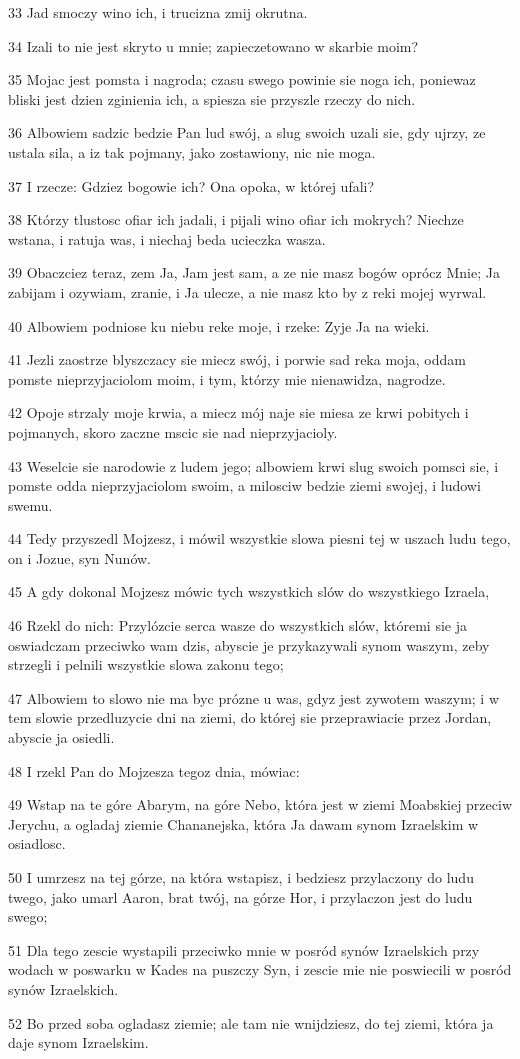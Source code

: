 \par 33 Jad smoczy wino ich, i trucizna zmij okrutna.
\par 34 Izali to nie jest skryto u mnie; zapieczetowano w skarbie moim?
\par 35 Mojac jest pomsta i nagroda; czasu swego powinie sie noga ich, poniewaz bliski jest dzien zginienia ich, a spiesza sie przyszle rzeczy do nich.
\par 36 Albowiem sadzic bedzie Pan lud swój, a slug swoich uzali sie, gdy ujrzy, ze ustala sila, a iz tak pojmany, jako zostawiony, nic nie moga.
\par 37 I rzecze: Gdziez bogowie ich? Ona opoka, w której ufali?
\par 38 Którzy tlustosc ofiar ich jadali, i pijali wino ofiar ich mokrych? Niechze wstana, i ratuja was, i niechaj beda ucieczka wasza.
\par 39 Obaczciez teraz, zem Ja, Jam jest sam, a ze nie masz bogów oprócz Mnie; Ja zabijam i ozywiam, zranie, i Ja ulecze, a nie masz kto by z reki mojej wyrwal.
\par 40 Albowiem podniose ku niebu reke moje, i rzeke: Zyje Ja na wieki.
\par 41 Jezli zaostrze blyszczacy sie miecz swój, i porwie sad reka moja, oddam pomste nieprzyjaciolom moim, i tym, którzy mie nienawidza, nagrodze.
\par 42 Opoje strzaly moje krwia, a miecz mój naje sie miesa ze krwi pobitych i pojmanych, skoro zaczne mscic sie nad nieprzyjacioly.
\par 43 Weselcie sie narodowie z ludem jego; albowiem krwi slug swoich pomsci sie, i pomste odda nieprzyjaciolom swoim, a milosciw bedzie ziemi swojej, i ludowi swemu.
\par 44 Tedy przyszedl Mojzesz, i mówil wszystkie slowa piesni tej w uszach ludu tego, on i Jozue, syn Nunów.
\par 45 A gdy dokonal Mojzesz mówic tych wszystkich slów do wszystkiego Izraela,
\par 46 Rzekl do nich: Przylózcie serca wasze do wszystkich slów, któremi sie ja oswiadczam przeciwko wam dzis, abyscie je przykazywali synom waszym, zeby strzegli i pelnili wszystkie slowa zakonu tego;
\par 47 Albowiem to slowo nie ma byc prózne u was, gdyz jest zywotem waszym; i w tem slowie przedluzycie dni na ziemi, do której sie przeprawiacie przez Jordan, abyscie ja osiedli.
\par 48 I rzekl Pan do Mojzesza tegoz dnia, mówiac:
\par 49 Wstap na te góre Abarym, na góre Nebo, która jest w ziemi Moabskiej przeciw Jerychu, a ogladaj ziemie Chananejska, która Ja dawam synom Izraelskim w osiadlosc.
\par 50 I umrzesz na tej górze, na która wstapisz, i bedziesz przylaczony do ludu twego, jako umarl Aaron, brat twój, na górze Hor, i przylaczon jest do ludu swego;
\par 51 Dla tego zescie wystapili przeciwko mnie w posród synów Izraelskich przy wodach w poswarku w Kades na puszczy Syn, i zescie mie nie poswiecili w posród synów Izraelskich.
\par 52 Bo przed soba ogladasz ziemie; ale tam nie wnijdziesz, do tej ziemi, która ja daje synom Izraelskim.


